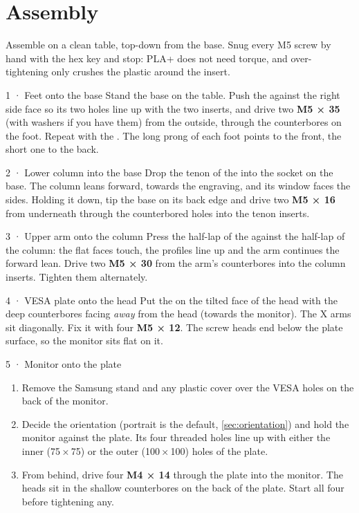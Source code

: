 \section{Assembly}\label{sec:assembly}

Assemble on a clean table, top-down from the base. Snug every M5 screw by hand with the hex key and stop: PLA+
does not need torque, and over-tightening only crushes the plastic around the insert.

\begin{step}{1 · Feet onto the base}
Stand the base on the table. Push the  against the right side face so its two holes line up with the
two inserts, and drive two \textbf{M5 × 35} (with washers if you have them) from the outside, through the counterbores on
the foot. Repeat with the . The long prong of each foot points to the front, the short one to the back.
\end{step}

\begin{step}{2 · Lower column into the base}
Drop the tenon of the  into the socket on the base. The column leans forward, towards the
 engraving, and its window faces the sides. Holding it down, tip the base on its back edge and drive
two \textbf{M5 × 16} from underneath through the counterbored holes into the tenon inserts.
\end{step}

\begin{step}{3 · Upper arm onto the column}
Press the half-lap of the  against the half-lap of the column: the flat faces touch, the profiles line up
and the arm continues the forward lean. Drive two \textbf{M5 × 30} from the arm's counterbores into the column inserts.
Tighten them alternately.
\end{step}

\begin{step}{4 · VESA plate onto the head}
Put the  on the tilted face of the head with the deep counterbores facing \emph{away} from the head
(towards the monitor). The X arms sit diagonally. Fix it with four \textbf{M5 × 12}. The screw heads end below the
plate surface, so the monitor sits flat on it.
\end{step}

\begin{step}{5 · Monitor onto the plate}
\begin{enumerate}
  \item Remove the Samsung stand and any plastic cover over the VESA holes on the back of the monitor.
  \item Decide the orientation (portrait is the default, \cref{sec:orientation}) and hold the monitor against the plate.
        Its four threaded holes line up with either the inner (75\,×\,75) or the outer (100\,×\,100) holes of the plate.
  \item From behind, drive four \textbf{M4 × 14} through the plate into the monitor. The heads sit in the shallow
        counterbores on the back of the plate. Start all four before tightening any.
\end{enumerate}
\end{step}

